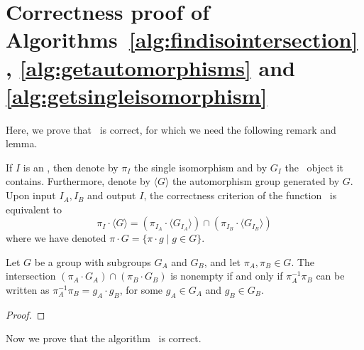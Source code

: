 \section{Correctness proof of Algorithms~\ref{alg:findisointersection}, \ref{alg:getautomorphisms} and \ref{alg:getsingleisomorphism}}


Here, we prove that \findisomorphismsetintersection~is correct, for which we need the following remark and lemma.

\begin{remark}
    \label{remark:correctness-isomorphism-intersection}
    If $I$ is an \isomorphismset, then denote by $\pi_I$ the single isomorphism and by $G_I$ the \automorphismgenerators~object it contains.
    Furthermore, denote by $\langle G\rangle$ the automorphism group generated by $G$.
    Upon input $I_A, I_B$ and output $I$, the correctness criterion of the function \findisomorphismsetintersection~is equivalent to 
    \[
        \pi_{I} \cdot \langle G \rangle = \left( \pi_{I_A} \cdot \langle G_{I_A} \rangle \right) \cap \left( \pi_{I_B} \cdot \langle G_{I_B} \rangle \right)
    \]
    where we have denoted $\pi \cdot G = \{\pi \cdot g \mid g \in G\}$.
\end{remark}


\begin{lemma}
    \label{thm:coset-intersection-nonempty}
    Let $G$ be a group with subgroups $G_A$ and $G_B$, and let $\pi_A, \pi_B \in G$.
    The intersection $(\pi_A \cdot G_A)\cap (\pi_B \cdot G_B)$ is nonempty if and only if $\pi_A^{-1} \pi_B$ can be written as $\pi_A^{-1}\pi_B=g_A \cdot g_B$, for some $g_A \in G_A$ and $g_B \in G_B$.
\end{lemma}
\begin{proof}
\end{proof}

Now we prove that the algorithm \findisomorphismsetintersection~is correct.

